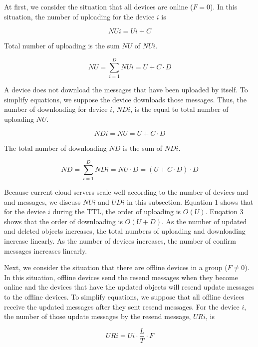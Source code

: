 At first, we consider the situation that all devices are online ($F=0$).
In this situation, the number of uploading for the device $i$ is

\begin{equation}
NUi = Ui + C
\end{equation}

Total number of uploading is the sum $NU$ of $NUi$.

\begin{equation}
NU = \sum_{i=1}^{D} NUi = U + C \cdot D
\end{equation}

A device does not download the messages that have been uploaded by itself.
To simplify equations, we suppose the device downloads those messages.
Thus, the number of downloading for device $i$, $NDi$, is the equal to total number of uploading $NU$.

\begin{equation}
NDi = NU = U + C \cdot D
\end{equation}

The total number of downloading $ND$ is the sum of $NDi$.

\begin{equation}
ND = \sum_{i=1}^{D} NDi = NU \cdot D =  (U + C \cdot D) \cdot D
\end{equation}

Because current cloud servers scale well according to the number of devices and and messages, we discuss $NUi$ and $UDi$ in this subsection.
Equation 1 shows that for the device $i$ during the TTL, the order of uploading  is $O(U)$.
Euqation 3 shows that the order of downloading is $O(U+D)$.
As the number of updated and deleted objects increases, the total numbers of uploading and downloading increase linearly.
As the number of devices increases, the number of confirm messages increases linearly.

Next, we consider the situation that there are offline devices in a group ($F \neq 0$).
In this situation, offline devices send the resend messages when they become online and the devices that have the updated objects will resend update messages to the offline devices.
To simplify equations, we suppose that all offline devices receive the updated messages after they sent resend messages.
For the device $i$, the number of those update messages by the resend message, $URi$, is

\begin{equation}
URi = Ui \cdot \frac{L}{T} \cdot F
\end{equation}

